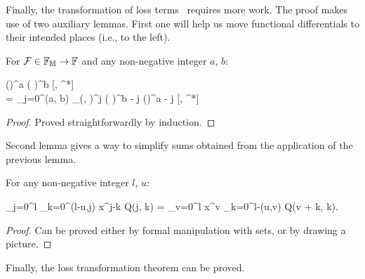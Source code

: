 Finally, the transformation of loss terms~ requires more work.
The proof makes use of two auxiliary lemmas.
First one will help us move functional differentials to their intended places (i.e., to the left).

\begin{lemma}
\label{lmm:transformations:swap-differential}
    For $\mathcal{F} \in \mathbb{F}_{\mathbb{M}} \rightarrow \mathbb{F}$ and any non-negative integer $a$, $b$:
    \begin{eqn*}
    	\Psi(\xvec)^a \left( \frac{\delta}{\delta \Psi(\xvec)} \right)^b [\Psi, \Psi^*] \\
    	= \sum_{j=0}^{\min(a, b)}
    		 
    		\delta_{\restbasis}(\xvec, \xvec)^j
    		\left( \frac{\delta}{\delta \Psi(\xvec)} \right)^{b - j}
    		\Psi(\xvec)^{a - j}
    		[\Psi, \Psi^*]
    \end{eqn*}
\end{lemma}
\begin{proof}
Proved straightforwardly by induction.
\end{proof}

Second lemma gives a way to simplify sums obtained from the application of the previous lemma.

\begin{lemma}
\label{lmm:transformations:sum-rearrangement}
    For any non-negative integer $l$, $u$:
    \begin{eqn*}
    	\sum_{j=0}^l \sum_{k=0}^{\min(l-u,j)} x^{j-k} Q(j, k)
    	= \sum_{v=0}^l x^v \sum_{k=0}^{l-\max(u,v)} Q(v + k, k).
    \end{eqn*}
\end{lemma}
\begin{proof}
Can be proved either by formal manipulation with sets, or by drawing a picture.
\end{proof}

Finally, the loss transformation theorem can be proved.

